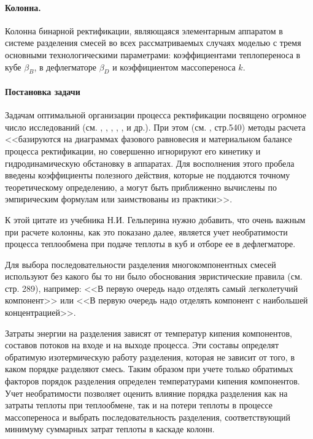 \documentclass{article}
\begin{document}
	\paragraph{Колонна.} Колонна бинарной ректификации, являющаяся элементарным аппаратом в системе разделения смесей во всех рассматриваемых случаях моделью с тремя основными технологическими параметрами: коэффициентами теплопереноса в кубе $\beta_B$, в дефлегматоре $\beta_D$ и коэффициентом массопереноса $k$.
	
	\paragraph{Постановка задачи} Задачам  оптимальной организации процесса ректификации посвящено огромное число исследований (см. \cite{PlnvskNklv}, \cite{Gelp}, \cite{Aleksandr1}, \cite{PetlSer}, \cite{Pavlov}, \cite{Kafar}   и др.). При этом (см. \cite{Gelp}, стр.540) методы расчета <<базируются на диаграммах фазового равновесия и материальном балансе процесса ректификации, но совершенно игнорируют его
кинетику и гидродинамическую обстановку в аппаратах. Для восполнения этого пробела введены коэффициенты полезного действия, которые не поддаются точному теоретическому определению, а могут быть приближенно вычислены по эмпирическим формулам или заимствованы из практики>>.

К этой цитате из учебника Н.И. Гельперина нужно добавить, что очень важным при расчете  колонны, как это показано далее, является учет необратимости процесса теплообмена при подаче теплоты в куб и отборе ее в дефлегматоре.
  
  Для выбора последовательности разделения многокомпонентных смесей используют без какого бы то ни было обоснования эвристические правила  (см.\cite{Kafar} стр. 289), например: <<В первую очередь надо отделять самый легколетучий компонент>> или <<В первую очередь надо отделять компонент с наибольшей концентрацией>>. 
  
  Затраты энергии на разделения зависят от температур кипения компонентов, составов потоков на входе и на выходе процесса. Эти составы определят обратимую изотермическую работу разделения, которая не зависит от того, в каком порядке разделяют смесь. Таким образом при учете только обратимых факторов порядок разделения определен температурами кипения компонентов. Учет необратимости позволяет оценить влияние порядка разделения как на затраты теплоты при теплообмене, так и на потери теплоты в процессе массопереноса и выбрать последовательность разделения, соответствующий минимуму суммарных затрат теплоты в каскаде колонн. 
     
\end{document}
